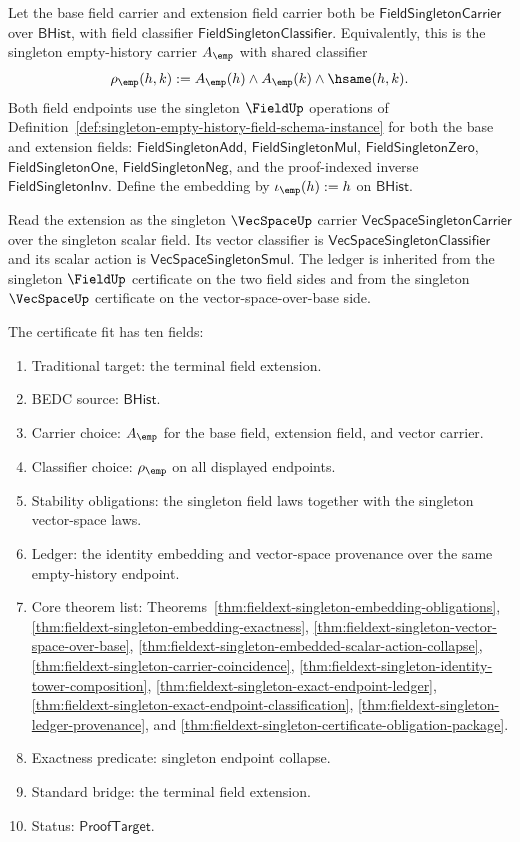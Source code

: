 \begin{definition}
\label{def:fieldext-singleton-empty-history-instance}
Let the base field carrier and extension field carrier both be
$\mathsf{FieldSingletonCarrier}$ over $\mathsf{BHist}$, with field classifier
$\mathsf{FieldSingletonClassifier}$. Equivalently, this is the singleton
empty-history carrier $A_{\emp}$ with shared classifier
$$
\rho_{\emp}(h,k):=
A_{\emp}(h)\land A_{\emp}(k)\land\hsame(h,k).
$$
Both field endpoints use the singleton $\FieldUp$ operations of
Definition~\ref{def:singleton-empty-history-field-schema-instance} for both
the base and extension fields:
$\mathsf{FieldSingletonAdd}$, $\mathsf{FieldSingletonMul}$,
$\mathsf{FieldSingletonZero}$, $\mathsf{FieldSingletonOne}$,
$\mathsf{FieldSingletonNeg}$, and the proof-indexed inverse
$\mathsf{FieldSingletonInv}$. Define the embedding by
$\iota_{\emp}(h):=h$ on $\mathsf{BHist}$.

Read the extension as the singleton $\VecSpaceUp$ carrier
$\mathsf{VecSpaceSingletonCarrier}$ over the singleton scalar field. Its
vector classifier is $\mathsf{VecSpaceSingletonClassifier}$ and its scalar
action is $\mathsf{VecSpaceSingletonSmul}$. The ledger is inherited from the
singleton $\FieldUp$ certificate on the two field sides and from the singleton
$\VecSpaceUp$ certificate on the vector-space-over-base side.

The certificate fit has ten fields:
\begin{enumerate}
  \item Traditional target: the terminal field extension.
  \item BEDC source: $\mathsf{BHist}$.
  \item Carrier choice: $A_{\emp}$ for the base field, extension field, and
  vector carrier.
  \item Classifier choice: $\rho_{\emp}$ on all displayed endpoints.
  \item Stability obligations: the singleton field laws together with the
  singleton vector-space laws.
  \item Ledger: the identity embedding and vector-space provenance over the
  same empty-history endpoint.
  \item Core theorem list:
  Theorems~\ref{thm:fieldext-singleton-embedding-obligations},
  \ref{thm:fieldext-singleton-embedding-exactness},
  \ref{thm:fieldext-singleton-vector-space-over-base},
  \ref{thm:fieldext-singleton-embedded-scalar-action-collapse},
  \ref{thm:fieldext-singleton-carrier-coincidence},
  \ref{thm:fieldext-singleton-identity-tower-composition},
  \ref{thm:fieldext-singleton-exact-endpoint-ledger},
  \ref{thm:fieldext-singleton-exact-endpoint-classification},
  \ref{thm:fieldext-singleton-ledger-provenance}, and
  \ref{thm:fieldext-singleton-certificate-obligation-package}.
  \item Exactness predicate: singleton endpoint collapse.
  \item Standard bridge: the terminal field extension.
  \item Status: $\mathsf{ProofTarget}$.
\end{enumerate}
\end{definition}

